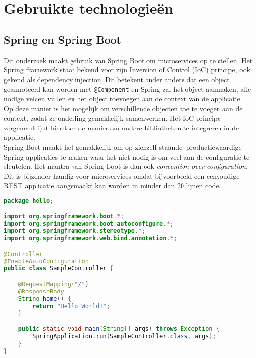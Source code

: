 
\chapter{Gebruikte technologieën}
\label{ch:technologieën}



\section{Spring en Spring Boot}
\label{sec:spring-boot}

Dit onderzoek maakt gebruik van Spring Boot om microservices op te stellen. Het Spring framework staat bekend voor zijn Inversion of Control (IoC) principe, ook gekend als dependency injection. Dit betekent onder andere dat een object geannoteerd kan worden met \texttt{@Component} en Spring zal het object aanmaken, alle nodige velden vullen en het object toevoegen aan de context van de applicatie. Op deze manier is het mogelijk om verschillende objecten toe te voegen aan de context, zodat ze onderling gemakkelijk samenwerken. Het IoC principe vergemakklijkt hierdoor de manier om andere bibliotheken te integreren in de applicatie. \\

Spring Boot maakt het gemakkelijk om op zichzelf staande, productiewaardige Spring applicaties te maken waar het niet nodig is om veel aan de configuratie te sleutelen. Het mantra van Spring Boot is dan ook \textit{convention-over-configuration}. Dit is bijzonder handig voor microservices omdat bijvoorbeeld een eenvoudige REST applicatie aangemaakt kan worden in minder dan 20 lijnen code. \\

\begin{lstlisting}[language=Java, caption=eenvoudige Spring Boot REST app]
package hello;

import org.springframework.boot.*;
import org.springframework.boot.autoconfigure.*;
import org.springframework.stereotype.*;
import org.springframework.web.bind.annotation.*;

@Controller
@EnableAutoConfiguration
public class SampleController {

    @RequestMapping("/")
    @ResponseBody
    String home() {
        return "Hello World!";
    }

    public static void main(String[] args) throws Exception {
        SpringApplication.run(SampleController.class, args);
    }
}
\end{lstlisting}

